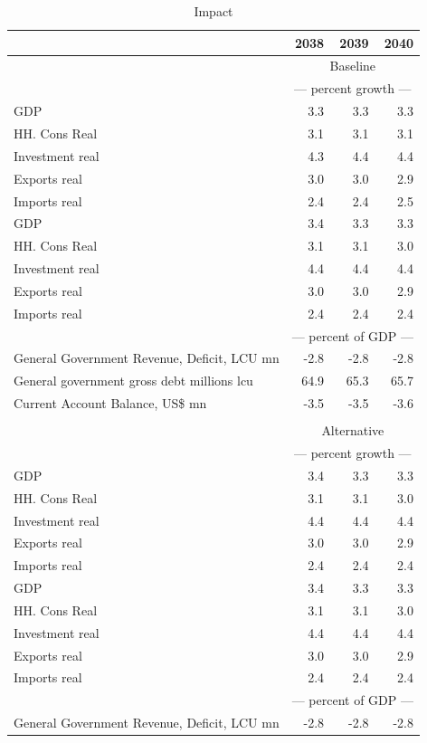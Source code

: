 \documentclass{article}
\begin{document}
 \begin{table}[ht]
\caption{Impact}
\begin{tabular}{lrrr}
\toprule
 & 2038 & 2039 & 2040 \\
\midrule
&\multicolumn{3}{c}{Baseline}       \\
&\multicolumn{3}{c}{--- percent growth ---}       \\
GDP & 3.3 & 3.3 & 3.3 \\
HH. Cons Real & 3.1 & 3.1 & 3.1 \\
Investment real & 4.3 & 4.4 & 4.4 \\
Exports real & 3.0 & 3.0 & 2.9 \\
Imports real & 2.4 & 2.4 & 2.5 \\
GDP & 3.4 & 3.3 & 3.3 \\
HH. Cons Real & 3.1 & 3.1 & 3.0 \\
Investment real & 4.4 & 4.4 & 4.4 \\
Exports real & 3.0 & 3.0 & 2.9 \\
Imports real & 2.4 & 2.4 & 2.4 \\
&\multicolumn{3}{c}{--- percent of GDP ---}       \\
General Government Revenue, Deficit, LCU mn & -2.8 & -2.8 & -2.8 \\
General government gross debt millions lcu & 64.9 & 65.3 & 65.7 \\
Current Account Balance, US\$ mn & -3.5 & -3.5 & -3.6 \\
&\multicolumn{3}{c}{  }       \\
&\multicolumn{3}{c}{Alternative}       \\
&\multicolumn{3}{c}{--- percent growth ---}       \\
GDP & 3.4 & 3.3 & 3.3 \\
HH. Cons Real & 3.1 & 3.1 & 3.0 \\
Investment real & 4.4 & 4.4 & 4.4 \\
Exports real & 3.0 & 3.0 & 2.9 \\
Imports real & 2.4 & 2.4 & 2.4 \\
GDP & 3.4 & 3.3 & 3.3 \\
HH. Cons Real & 3.1 & 3.1 & 3.0 \\
Investment real & 4.4 & 4.4 & 4.4 \\
Exports real & 3.0 & 3.0 & 2.9 \\
Imports real & 2.4 & 2.4 & 2.4 \\
&\multicolumn{3}{c}{--- percent of GDP ---}       \\
General Government Revenue, Deficit, LCU mn & -2.8 & -2.8 & -2.8 \\

\end{tabular}
\end{table}
\end{document}
